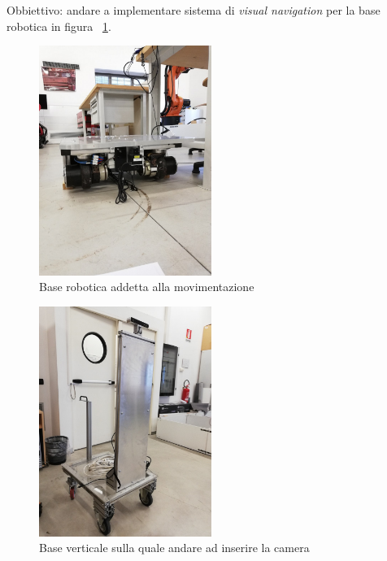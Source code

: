 Obbiettivo: andare a implementare sistema di \textit{visual navigation} per la base robotica in figura ~\ref{fig:BaseRobotica}.

\begin{figure}
	\centering
	\includegraphics[width=0.5\textwidth]{Immagini/BaseRobotica.jpg}
	\caption{Base robotica addetta alla movimentazione}
	\label{fig:BaseRobotica}
\end{figure}

\begin{figure}
	\centering
	\includegraphics[width=0.5\textwidth]{Immagini/SupportoCamera.jpg}
	\caption{Base verticale sulla quale andare ad inserire la camera}
	\label{fig:SupportoRialzato}
\end{figure}

